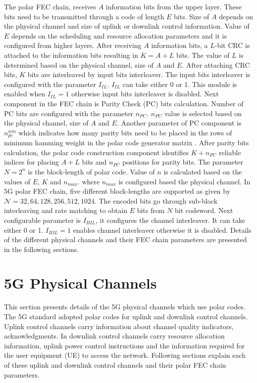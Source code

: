 The polar FEC chain, receives $A$ information bits from the upper layer. These bits need to be transmitted through a code of length $E$ bits. Size of $A$ depends on the physical channel and size of uplink or downlink control information. Value of $ E $ depends on the scheduling and resource allocation parameters and it is configured from higher layers. After receiving $A$ information bits, a $L$-bit CRC is attached to the information bits resulting in $K = A + L$ bits. The  value of $L$ is determined based on the physical channel, size of $A$ and $E$. After attaching CRC bits, $K$ bits are interleaved by input bits interleaver. The input bits interleaver is configured with the parameter $I_{IL}$. $I_{IL}$ can take either 0 or 1. This module is enabled when $I_{IL} = 1$ otherwise input bits interleaver is disabled. Next component in the FEC chain is Parity Check (PC) bits calculation. Number of PC bits are configured with the parameter $n_{PC}$. $n_{PC}$ value is selected based on the physical channel, size of $A$ and $E$. Another parameter of PC component is $n_{pc}^{wm}$ which indicates how many parity bits need to be placed in the rows of minimum hamming weight in the polar code generator matrix \cite{3gpp.38.212}. After parity bits calculation, the polar code construction component identifies  $K + n_{PC}$ reliable indices for placing $A+L$ bits and $n_{PC}$ positions for parity bits. The parameter $N = 2^n$ is the block-length of polar code. Value of $n$ is calculated based on the values of $E$, $K$ and $n_{max}$. where $n_{max}$ is configured based the physical channel. In 5G polar FEC chain, five different block-lengths are supported as given by $\mathcal{N} = {32,64,128,256,512,1024}$. The encoded bits go through sub-block interleaving and rate matching to obtain $E$ bits from $N$ bit codeword. Next configurable parameter is $I_{BIL}$, it configures the channel interleaver. It can take either 0 or 1. $I_{BIL} = 1$ enables channel interleaver otherwise it is disabled. Details of the different physical channels and their FEC chain parameters are presented in the following sections.

\section{5G Physical Channels}
This section presents details of the 5G physical channels which use polar codes. The 5G standard adopted polar codes for uplink and downlink control channels. Uplink control channels carry information about channel quality indicators, acknowledgments. In downlink control channels carry resource allocation information, uplink power control instructions and the information required for the user equipment (UE) to access the network. Following sections explain each of these uplink and downlink control channels and their polar FEC chain parameters.

